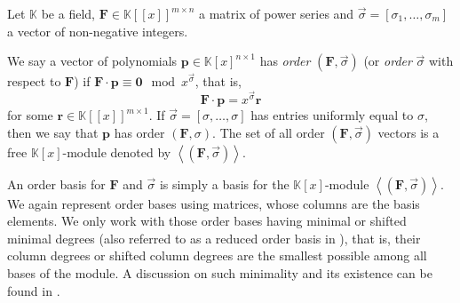 Let $\mathbb{K}$ be a field, $\mathbf{F}\in\mathbb{K}\left[\left[x\right]\right]^{m\times n}$
a matrix of power series and $\vec{\sigma}=\left[\sigma_{1},\dots,\sigma_{m}\right]$
a vector of non-negative integers. 
\begin{defn}
We say a vector of polynomials $\mathbf{p}\in\mathbb{K}\left[x\right]^{n\times1}$
has \emph{order} $\left(\mathbf{F},\vec{\sigma}\right)$ (or \emph{order}
$\vec{\sigma}$ with respect to $\mathbf{F}$) if $\mathbf{F}\cdot\mathbf{p}\equiv\mathbf{0}\mod x^{\vec{\sigma}}$,
that is, 
\[
\mathbf{F}\cdot\mathbf{p}=x^{\vec{\sigma}}\mathbf{r}
\]
for some $\mathbf{r}\in\mathbb{K}\left[\left[x\right]\right]^{m\times1}$.
If $\vec{\sigma}=\left[\sigma,\dots,\sigma\right]$ has entries uniformly
equal to $\sigma$, then we say that $\mathbf{p}$ has order $\left(\mathbf{F},\sigma\right).$
The set of all order $\left(\mathbf{F},\vec{\sigma}\right)$ vectors
is a free $\mathbb{K}\left[x\right]$-module denoted by $\left\langle \left(\mathbf{F},\vec{\sigma}\right)\right\rangle $. 
\end{defn}
An order basis for $\mathbf{F}$ and $\vec{\sigma}$ is simply a basis
for the $\mathbb{K}\left[x\right]$-module $\left\langle \left(\mathbf{F},\vec{\sigma}\right)\right\rangle $.
We again represent order bases using matrices, whose columns are the
basis elements. We only work with those order bases having minimal
or shifted minimal degrees (also referred to as a reduced order basis
in \cite{BL1997}), that is, their column degrees or shifted column
degrees are the smallest possible among all bases of the module. A
discussion on such minimality and its existence can be found in \cite[Chapter 2]{zhou:phd2012}.

